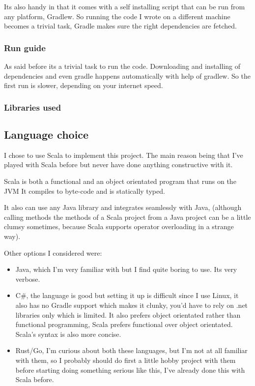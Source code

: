 \documentclass{article}
\begin{document}
Its also handy in that it comes with a self installing script that can be run
from any platform, Gradlew. So running the code I wrote on a different machine
becomes a trivial task, Gradle makes sure the right dependencies are fetched.

\subsubsection{Run guide}
As said before its a trivial task to run the code. Downloading and installing
of dependencies and even gradle happens automatically with help of gradlew.
So the first run is slower, depending on your internet speed.

\subsubsection{Libraries used}

\subsection{Language choice}
I chose to use Scala to implement this project. The main reason being that I've
played with Scala before but never have done anything constructive with it.

Scala is both a functional and an object orientated program that runs on the JVM
It compiles to byte-code and is statically typed.

It also can use any Java library and integrates seamlessly with Java, (although
calling methods the methods of a Scala project from a Java project can be
a little clumsy sometimes, because Scala supports operator overloading in
a strange way).

Other options I considered were:
\begin{itemize}
	\item Java, which I'm very familiar with but I find quite boring to use.
		Its very verbose.
	\item C\#, the language is good but setting it up is difficult since I
		use Linux, it also has no Gradle support which makes it clunky,
		you'd have to rely on .net libraries only which is limited. It
		also prefers object orientated  rather than functional programming,
		Scala prefers functional over object orientated.
		Scala's syntax is also more concise.
	\item Rust/Go, I'm curious about both these languages, but I'm not at
		all familiar with them, so I probably should do first a little
		hobby project with them before starting doing something serious like
		this, I've already done this with Scala before.
\end{itemize}
\end{document}
